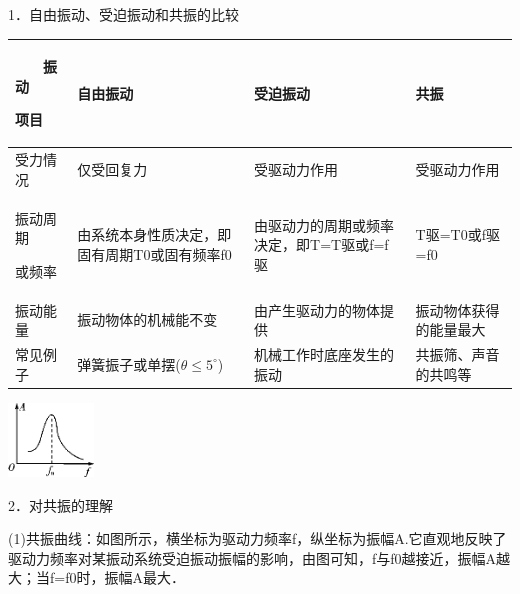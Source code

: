 1．自由振动、受迫振动和共振的比较

\begin{longtable}[]{@{}llll@{}}
\toprule
\begin{minipage}[b]{0.22\columnwidth}\raggedright
　　振动

项目　　\strut
\end{minipage} & \begin{minipage}[b]{0.22\columnwidth}\raggedright
自由振动\strut
\end{minipage} & \begin{minipage}[b]{0.22\columnwidth}\raggedright
受迫振动\strut
\end{minipage} & \begin{minipage}[b]{0.22\columnwidth}\raggedright
共振\strut
\end{minipage}\tabularnewline
\midrule
\endhead
受力情况 & 仅受回复力 & 受驱动力作用 & 受驱动力作用\tabularnewline
\begin{minipage}[t]{0.22\columnwidth}\raggedright
振动周期

或频率　\strut
\end{minipage} & \begin{minipage}[t]{0.22\columnwidth}\raggedright
由系统本身性质决定，即固有周期T0或固有频率f0\strut
\end{minipage} & \begin{minipage}[t]{0.22\columnwidth}\raggedright
由驱动力的周期或频率决定，即T=T驱或f=f驱\strut
\end{minipage} & \begin{minipage}[t]{0.22\columnwidth}\raggedright
T驱=T0或f驱=f0　\strut
\end{minipage}\tabularnewline
振动能量 & 振动物体的机械能不变 & 由产生驱动力的物体提供 &
振动物体获得的能量最大\tabularnewline
常见例子 & 弹簧振子或单摆($\theta \leq 5^\circ$) & 机械工作时底座发生的振动 &
共振筛、声音的共鸣等\tabularnewline
\bottomrule
\end{longtable}

\begin{center}\includegraphics[width=0.89653in,height=0.77361in]{media/image519.png}\end{center}
2．对共振的理解

(1)共振曲线：如图所示，横坐标为驱动力频率f，纵坐标为振幅A.它直观地反映了驱动力频率对某振动系统受迫振动振幅的影响，由图可知，f与f0越接近，振幅A越大；当f=f0时，振幅A最大．

